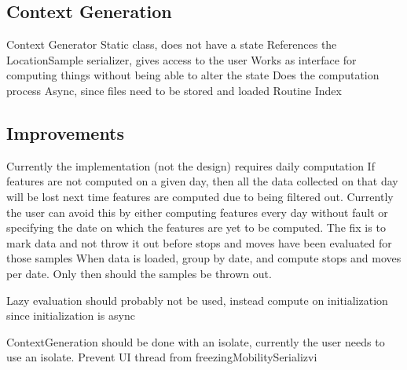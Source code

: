 \subsection{Context Generation}
Context Generator
Static class, does not have a state
References the LocationSample serializer, gives access to the user
Works as interface for computing things without being able to alter the state
Does the computation process
Async, since files need to be stored and loaded
Routine Index



\subsection{Improvements}
Currently the implementation (not the design) requires daily computation
If features are not computed on a given day, then all the data collected on that day will be lost next time features are computed due to being filtered out. Currently the user can avoid this by either computing features every day without fault or specifying the date on which the features are yet to be computed.
The fix is to mark data and not throw it out before stops and moves have been evaluated for those samples
When data is loaded, group by date, and compute stops and moves per date. Only then should the samples be thrown out.

Lazy evaluation should probably not be used, instead compute on initialization since initialization is async

ContextGeneration should be done with an isolate, currently the user needs to use an isolate.
Prevent UI thread from freezingMobilitySerializvi